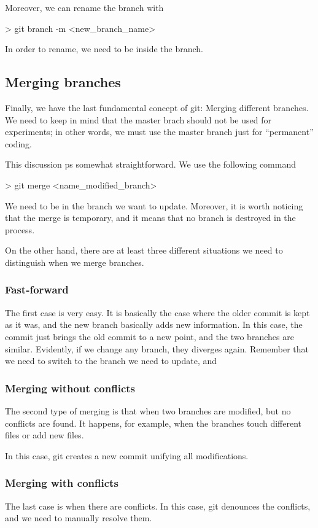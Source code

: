 Moreover, we can rename the branch with
\begin{listing}{1}
> git branch -m <new_branch_name>
\end{listing}
In order to rename, we need to be inside the branch.

\subsection{Merging branches}

Finally, we have the last fundamental concept of git: Merging different branches. We need to 
keep in mind that the master brach should not be used for experiments; in other words, we must use 
the master branch just for ``permanent'' coding. 

This discussion ps somewhat straightforward. We use the following command 
\begin{listing}{1}
> git merge <name_modified_branch> 
\end{listing}
We need to be in the branch we want to update. Moreover, it is worth noticing that the merge is 
temporary, and it means that no branch is destroyed in the process. 

On the other hand, there are at least three different situations we need to distinguish when we 
merge branches.

\subsubsection{Fast-forward}

The first case is very easy. It is basically the case where the older commit is kept as it was, 
and the new branch basically adds new information. In this case, the commit just brings the old 
commit to a new point, and the two branches are similar. Evidently, if we change any branch, they 
diverges again. Remember that we need to switch to the branch we need to update, and  

\subsubsection{Merging without conflicts}

The second type of merging is that when two branches are modified, but no conflicts are found. 
It happens, for example, when the branches touch different files or add new files. 

In this case, git creates a new commit unifying all modifications.

\subsubsection{Merging with conflicts}

The last case is when there are conflicts. In this case, git denounces the conflicts, and we need 
to manually resolve them.






